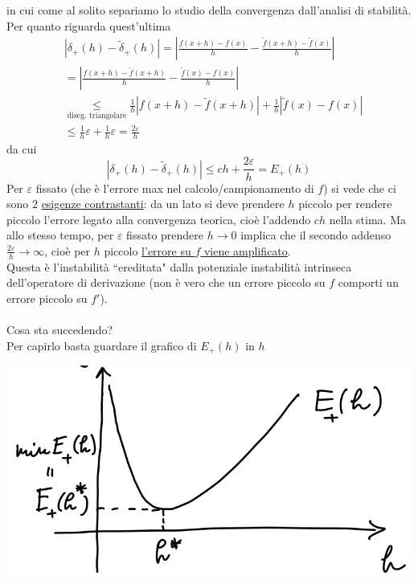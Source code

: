 in cui come al solito separiamo lo studio della convergenza dall'analisi di stabilità.\\
Per quanto riguarda quest'ultima
\begin{equation*}
    \begin{split}
        & |\delta_+(h)-\tilde{\delta}_+(h)| = | \frac{f(x+h) - f(x)}{h} - \frac{\tilde{f}(x+h) - \tilde{f}(x)}{h}| \\
        & = | \frac{f(x+h) - \tilde{f}(x+h)}{h} - \frac{\tilde{f}(x) - f(x)}{h}| \\
        & \underset{\text{diseg. triangolare}}{\leq} \frac{1}{h}|f(x+h) - \tilde{f}(x+h)| + \frac{1}{h}|\tilde{f}(x) - f(x)| \\
        & \leq \frac{1}{h}\varepsilon + \frac{1}{h}\varepsilon = \frac{2\varepsilon}{h}
    \end{split}
\end{equation*}
da cui 
\begin{equation*}
    |\delta_+(h)-\tilde{\delta}_+(h)| \leq ch+\frac{2\varepsilon}{h} = E_+(h)
\end{equation*}
Per $\varepsilon$ fissato (che è l'errore max nel calcolo/campionamento di $f$) si vede che ci sono 2 \uline{esigenze
contrastanti}: da un lato si deve prendere $h$ piccolo per rendere piccolo l'errore legato alla convergenza teorica, cioè l'addendo $ch$ nella stima. Ma allo stesso tempo, per $\varepsilon$ fissato prendere $h \rightarrow 0$ implica che il secondo addenso $\frac{2\varepsilon}{h}\rightarrow \infty$, cioè per $h$ piccolo \uline{l'errore su $f$ viene amplificato}.\\
Questa è l'instabilità ``ereditata" dalla potenziale instabilità intrinseca dell'operatore di derivazione (non è vero che
un errore piccolo su $f$ comporti un errore piccolo su $f'$).\\
\vspace{0.1cm}
\\
Cosa sta succedendo? \\
Per capirlo basta guardare il grafico di $E_+(h)$ in $h$
\begin{center}
    \includegraphics[scale=0.5]{foto/pag15}    
\end{center}
